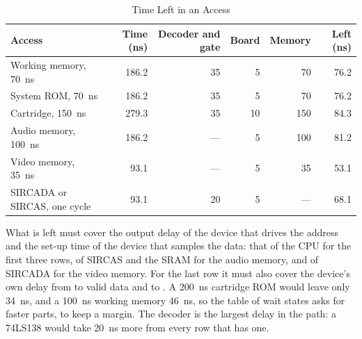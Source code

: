 \begin{table}[H]
	\centering
	\small
	\begin{tabular}{lrrrrr}
		\toprule
		\textbf{Access}              & \textbf{Time (ns)} & \textbf{Decoder and gate} & \textbf{Board} & \textbf{Memory} & \textbf{Left (ns)} \\
		\midrule
		Working memory, 70~ns        & 186.2              & 35                        & 5              & 70              & 76.2               \\
		System ROM, 70~ns            & 186.2              & 35                        & 5              & 70              & 76.2               \\
		Cartridge, 150~ns            & 279.3              & 35                        & 10             & 150             & 84.3               \\
		Audio memory, 100~ns         & 186.2              & ---                       & 5              & 100             & 81.2               \\
		Video memory, 35~ns          & 93.1               & ---                       & 5              & 35              & 53.1               \\
		SIRCADA or SIRCAS, one cycle & 93.1               & 20                        & 5              & ---             & 68.1               \\
		\bottomrule
	\end{tabular}
	\caption{Time Left in an Access}
	\label{tab:margins}
\end{table}

\noindent What is left must cover the output delay of the device that drives the address and the set-up time of the device that
samples the data: that of the CPU for the first three rows, of SIRCAS and the SRAM for the audio memory, and of SIRCADA for
the video memory. For the last row it must also cover the device's own delay from  to valid data and to
. A 200~ns cartridge ROM would leave only 34~ns, and a 100~ns working memory 46~ns, so the table of wait states asks for
faster parts, to keep a margin. The decoder is the largest delay in the path: a 74LS138 would take 20~ns more from every row
that has one.

